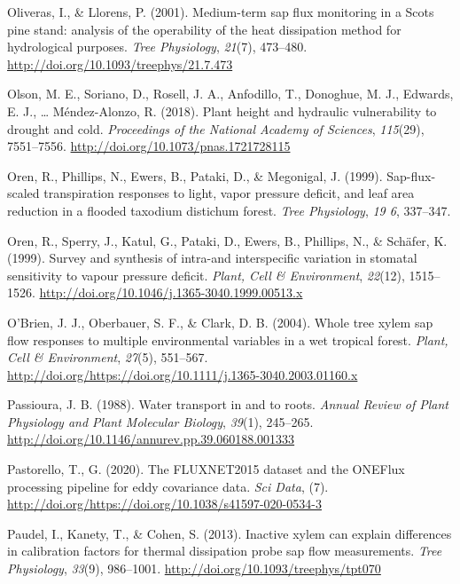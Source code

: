 \documentclass[11pt,twoside]{reedthesis}
\begin{document}
\hypertarget{ref-Oliveras2001}{}
Oliveras, I., \& Llorens, P. (2001). Medium-term sap flux monitoring in
a Scots pine stand: analysis of the operability of the heat dissipation
method for hydrological purposes. \emph{Tree Physiology}, \emph{21}(7),
473--480. \url{http://doi.org/10.1093/treephys/21.7.473}

\hypertarget{ref-olson_plant_2018}{}
Olson, M. E., Soriano, D., Rosell, J. A., Anfodillo, T., Donoghue, M.
J., Edwards, E. J., \ldots{} Méndez-Alonzo, R. (2018). Plant height and
hydraulic vulnerability to drought and cold. \emph{Proceedings of the
National Academy of Sciences}, \emph{115}(29), 7551--7556.
\url{http://doi.org/10.1073/pnas.1721728115}

\hypertarget{ref-Oren1999b}{}
Oren, R., Phillips, N., Ewers, B., Pataki, D., \& Megonigal, J. (1999).
Sap-flux-scaled transpiration responses to light, vapor pressure
deficit, and leaf area reduction in a flooded taxodium distichum forest.
\emph{Tree Physiology}, \emph{19 6}, 337--347.

\hypertarget{ref-Oren1999}{}
Oren, R., Sperry, J., Katul, G., Pataki, D., Ewers, B., Phillips, N., \&
Schäfer, K. (1999). Survey and synthesis of intra-and interspecific
variation in stomatal sensitivity to vapour pressure deficit.
\emph{Plant, Cell \& Environment}, \emph{22}(12), 1515--1526.
\url{http://doi.org/10.1046/j.1365-3040.1999.00513.x}

\hypertarget{ref-Obrien2004}{}
O'Brien, J. J., Oberbauer, S. F., \& Clark, D. B. (2004). Whole tree
xylem sap flow responses to multiple environmental variables in a wet
tropical forest. \emph{Plant, Cell \& Environment}, \emph{27}(5),
551--567.
\url{http://doi.org/https://doi.org/10.1111/j.1365-3040.2003.01160.x}

\hypertarget{ref-Passioura1988}{}
Passioura, J. B. (1988). Water transport in and to roots. \emph{Annual
Review of Plant Physiology and Plant Molecular Biology}, \emph{39}(1),
245--265. \url{http://doi.org/10.1146/annurev.pp.39.060188.001333}

\hypertarget{ref-Pastorello2020}{}
Pastorello, T., G. (2020). The FLUXNET2015 dataset and the ONEFlux
processing pipeline for eddy covariance data. \emph{Sci Data}, (7).
\url{http://doi.org/https://doi.org/10.1038/s41597-020-0534-3}

\hypertarget{ref-Paudel2013}{}
Paudel, I., Kanety, T., \& Cohen, S. (2013). Inactive xylem can explain
differences in calibration factors for thermal dissipation probe sap
flow measurements. \emph{Tree Physiology}, \emph{33}(9), 986--1001.
\url{http://doi.org/10.1093/treephys/tpt070}
\end{document}
